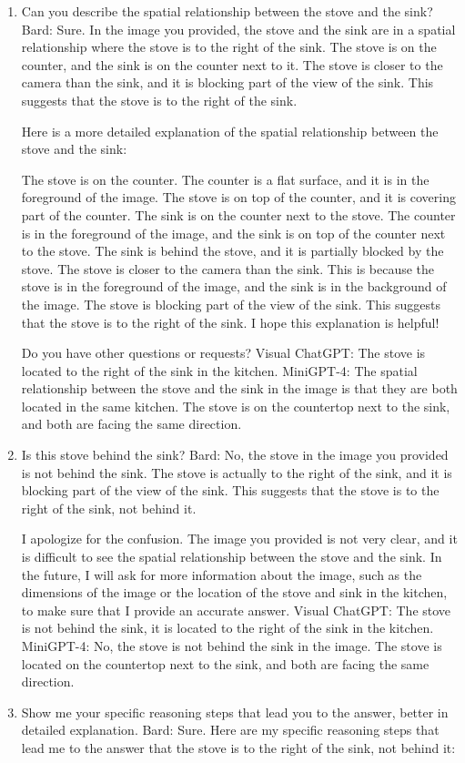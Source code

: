 \begin{enumerate}
    \item Can you describe the spatial relationship between the stove and the sink?
    \subitem Bard: 
    Sure. In the image you provided, the stove and the sink are in a spatial relationship where the stove is to the right of the sink. The stove is on the counter, and the sink is on the counter next to it. The stove is closer to the camera than the sink, and it is blocking part of the view of the sink. This suggests that the stove is to the right of the sink.
    
    Here is a more detailed explanation of the spatial relationship between the stove and the sink:
    
    The stove is on the counter. The counter is a flat surface, and it is in the foreground of the image. The stove is on top of the counter, and it is covering part of the counter.
    The sink is on the counter next to the stove. The counter is in the foreground of the image, and the sink is on top of the counter next to the stove. The sink is behind the stove, and it is partially blocked by the stove.
    The stove is closer to the camera than the sink. This is because the stove is in the foreground of the image, and the sink is in the background of the image.
    The stove is blocking part of the view of the sink. This suggests that the stove is to the right of the sink.
    I hope this explanation is helpful!
    
    Do you have other questions or requests?
    \subitem Visual ChatGPT: The stove is located to the right of the sink in the kitchen.
    \subitem MiniGPT-4: The spatial relationship between the stove and the sink in the image is that they are both located in the same kitchen. The stove is on the countertop next to the sink, and both are facing the same direction.
    \item Is this stove behind the sink?
    \subitem Bard: 
    No, the stove in the image you provided is not behind the sink. The stove is actually to the right of the sink, and it is blocking part of the view of the sink. This suggests that the stove is to the right of the sink, not behind it.
    
    I apologize for the confusion. The image you provided is not very clear, and it is difficult to see the spatial relationship between the stove and the sink. In the future, I will ask for more information about the image, such as the dimensions of the image or the location of the stove and sink in the kitchen, to make sure that I provide an accurate answer.
    \subitem Visual ChatGPT: The stove is not behind the sink, it is located to the right of the sink in the kitchen.
    \subitem MiniGPT-4: No, the stove is not behind the sink in the image. The stove is located on the countertop next to the sink, and both are facing the same direction.
    \item Show me your specific reasoning steps that lead you to the answer, better in detailed explanation.
    \subitem Bard: Sure. Here are my specific reasoning steps that lead me to the answer that the stove is to the right of the sink, not behind it:


\end{enumerate}
